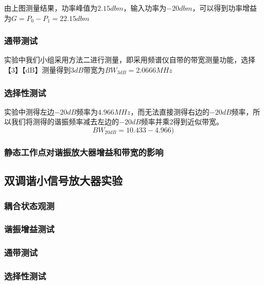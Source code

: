 \documentclass{../source/Experiment}
\begin{document}
            由上图测量结果，功率峰值为$2.15dbm$，输入功率为$-20dbm$，可以得到功率增益为$G = P_0 - P_1 = 22.15dbm$
            
            \subsubsection{通带测试}

            实验中我们小组采用方法二进行测量，即采用频谱仪自带的带宽测量功能，选择【3】【dB】测量得到$3dB$带宽为$BW_{3dB} = 2.0666MHz$
            
            \subsubsection{选择性测试}

            实验中测得左边$-20dB$频率为$4.966MHz$，而无法直接测得右边的$-20dB$频率，所以我们将测得的谐振频率减去左边的$-20dB$频率并乘2得到近似带宽。
            $$BW_{20dB} = 10.433 - 4.966)$$
            
            \subsubsection{静态工作点对谐振放大器增益和带宽的影响}
            
        \subsection{双调谐小信号放大器实验}
            
            \subsubsection{耦合状态观测}
            
            \subsubsection{谐振增益测试}
            
            \subsubsection{通带测试}
            
            \subsubsection{选择性测试}
            
\end{document}
